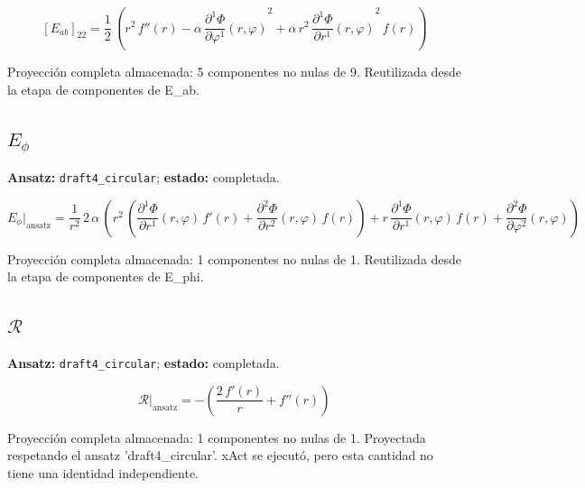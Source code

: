 \documentclass[11pt]{article}
\begin{document}
\begin{dmath*}[breakdepth={5}]
\left[E_{ab}\right]_{22} = \frac{1}{2}\,\left({r}^{2}\,f''\!\left(r\right) - \alpha\,{\frac{\partial^{1} \Phi}{\partial \varphi^{1}}\!\left(r, \varphi\right)}^{2} + \alpha\,{r}^{2}\,{\frac{\partial^{1} \Phi}{\partial r^{1}}\!\left(r, \varphi\right)}^{2}\,f\!\left(r\right)\right)
\end{dmath*}
\par\smallskip
Proyección completa almacenada: 5 componentes no nulas de 9. Reutilizada desde la etapa de componentes de E\_ab.\par\medskip
{}
\subsection*{$ E_{\phi} $}
\textbf{Ansatz:} \texttt{draft4\_circular}; \textbf{estado:} completada.\par
\begin{dmath*}[breakdepth={5}]
E_{\phi}\big|_{\mathrm{ansatz}} = \frac{1}{{r}^{2}}\,2\,\alpha\,\left({r}^{2}\,\left(\frac{\partial^{1} \Phi}{\partial r^{1}}\!\left(r, \varphi\right)\,f'\!\left(r\right) + \frac{\partial^{2} \Phi}{\partial r^{2}}\!\left(r, \varphi\right)\,f\!\left(r\right)\right) + r\,\frac{\partial^{1} \Phi}{\partial r^{1}}\!\left(r, \varphi\right)\,f\!\left(r\right) + \frac{\partial^{2} \Phi}{\partial \varphi^{2}}\!\left(r, \varphi\right)\right)
\end{dmath*}
\par\smallskip
Proyección completa almacenada: 1 componentes no nulas de 1. Reutilizada desde la etapa de componentes de E\_phi.\par\medskip
{}
\subsection*{$ \mathcal{R} $}
\textbf{Ansatz:} \texttt{draft4\_circular}; \textbf{estado:} completada.\par
\begin{dmath*}[breakdepth={5}]
\mathcal{R}\big|_{\mathrm{ansatz}} = -\left(\frac{2\,f'\!\left(r\right)}{r} + f''\!\left(r\right)\right)
\end{dmath*}
\par\smallskip
Proyección completa almacenada: 1 componentes no nulas de 1. Proyectada respetando el ansatz 'draft4\_circular'. xAct se ejecutó, pero esta cantidad no tiene una identidad independiente.\par\medskip
{}
\end{document}
